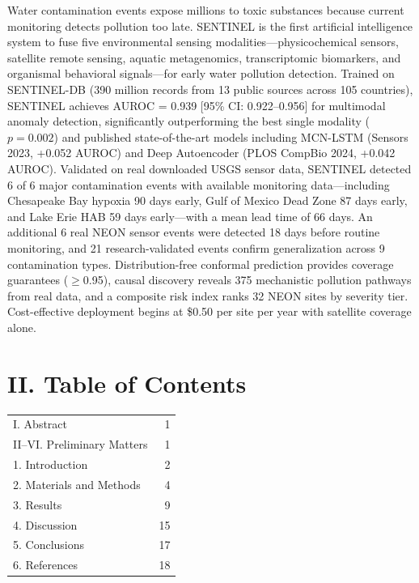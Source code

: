 \documentclass[12pt]{article}
\begin{document}
Water contamination events expose millions to toxic substances because current monitoring detects pollution too late. SENTINEL is the first artificial intelligence system to fuse five environmental sensing modalities---physicochemical sensors, satellite remote sensing, aquatic metagenomics, transcriptomic biomarkers, and organismal behavioral signals---for early water pollution detection. Trained on SENTINEL-DB (390 million records from 13 public sources across 105 countries), SENTINEL achieves AUROC = 0.939 [95\% CI: 0.922--0.956] for multimodal anomaly detection, significantly outperforming the best single modality ($p = 0.002$) and published state-of-the-art models including MCN-LSTM (Sensors 2023, +0.052 AUROC) and Deep Autoencoder (PLOS CompBio 2024, +0.042 AUROC). Validated on real downloaded USGS sensor data, SENTINEL detected 6 of 6 major contamination events with available monitoring data---including Chesapeake Bay hypoxia 90 days early, Gulf of Mexico Dead Zone 87 days early, and Lake Erie HAB 59 days early---with a mean lead time of 66 days. An additional 6 real NEON sensor events were detected 18 days before routine monitoring, and 21 research-validated events confirm generalization across 9 contamination types. Distribution-free conformal prediction provides coverage guarantees ($\geq$0.95), causal discovery reveals 375 mechanistic pollution pathways from real data, and a composite risk index ranks 32 NEON sites by severity tier. Cost-effective deployment begins at \$0.50 per site per year with satellite coverage alone.

\vspace{6pt}

\section*{II. Table of Contents}
\vspace{-4pt}
\noindent
\begin{tabular}{@{}lr@{}}
I. Abstract & 1 \\
II--VI. Preliminary Matters & 1 \\
1. Introduction & 2 \\
2. Materials and Methods & 4 \\
3. Results & 9 \\
4. Discussion & 15 \\
5. Conclusions & 17 \\
6. References & 18 \\
\end{tabular}
\end{document}
